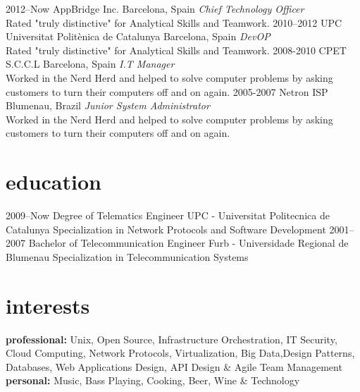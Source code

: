 \documentclass[]{friggeri-cv} %
\begin{document}
\begin{entrylist}
\entry
{2012--Now}
{AppBridge Inc.}
{Barcelona, Spain}
{\emph{Chief Technology Officer} \\
Rated "truly distinctive" for Analytical Skills and Teamwork.}
\entry
{2010--2012}
{UPC Universitat Politènica de Catalunya}
{Barcelona, Spain}
{\emph{DevOP} \\
Rated "truly distinctive" for Analytical Skills and Teamwork.}
\entry
{2008-2010}
{CPET S.C.C.L}
{Barcelona, Spain}
{\emph{I.T Manager} \\
Worked in the Nerd Herd and helped to solve computer problems by asking customers to turn their computers off and on again.}
\entry
{2005-2007}
{Netron ISP}
{Blumenau, Brazil}
{\emph{Junior System Administrator} \\
Worked in the Nerd Herd and helped to solve computer problems by asking customers to turn their computers off and on again.}
\end{entrylist}

\section{education}

\begin{entrylist}
\entry
{2009--Now}
{Degree {\normalfont of Telematics Engineer}}
{UPC - Universitat Politecnica de Catalunya}
{Specialization in Network Protocols and Software Development}
\entry
{2001--2007}
{Bachelor {\normalfont of Telecommunication Engineer}}
{Furb -  Universidade Regional de Blumenau}
{Specialization in Telecommunication Systems}
\end{entrylist}


\section{interests}

\textbf{professional:} Unix, Open Source, Infrastructure Orchestration, IT Security, Cloud Computing, Network Protocols, Virtualization, Big Data,Design Patterns, Databases, Web Applications Design, API Design \& Agile Team Management \textbf{personal:} Music, Bass Playing, Cooking, Beer, Wine \& Technology 
\end{document}
